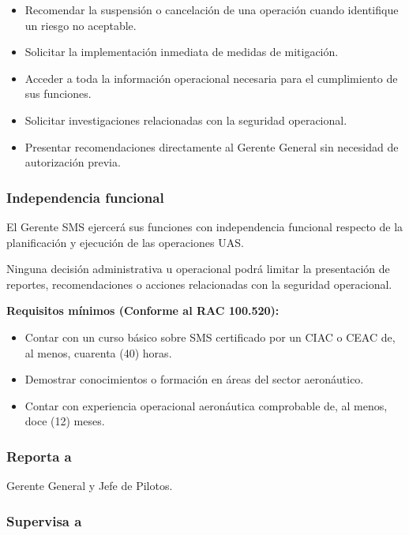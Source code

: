 \begin{itemize}

\item Recomendar la suspensión o cancelación de una operación cuando identifique un riesgo no aceptable.

\item Solicitar la implementación inmediata de medidas de mitigación.

\item Acceder a toda la información operacional necesaria para el cumplimiento de sus funciones.

\item Solicitar investigaciones relacionadas con la seguridad operacional.

\item Presentar recomendaciones directamente al Gerente General sin necesidad de autorización previa.

\end{itemize}

\subsubsection*{Independencia funcional}

El Gerente SMS ejercerá sus funciones con independencia funcional respecto de la planificación y ejecución de las operaciones UAS.

Ninguna decisión administrativa u operacional podrá limitar la presentación de reportes, recomendaciones o acciones relacionadas con la seguridad operacional.

\textbf{Requisitos mínimos (Conforme al RAC 100.520):}
\begin{itemize}
    \item Contar con un curso básico sobre SMS certificado por un CIAC o CEAC de, al menos, cuarenta (40) horas.
    \item Demostrar conocimientos o formación en áreas del sector aeronáutico.
    \item Contar con experiencia operacional aeronáutica comprobable de, al menos, doce (12) meses.
\end{itemize}

\subsubsection*{Reporta a}

Gerente General y Jefe de Pilotos.

\subsubsection*{Supervisa a}

